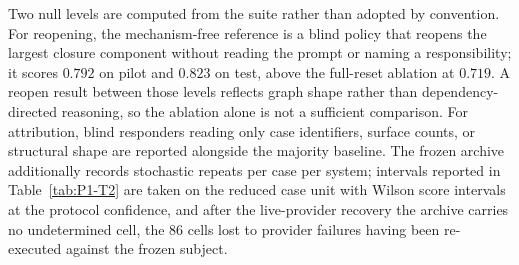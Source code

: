 Two null levels are computed from the suite rather than adopted by convention.
For reopening, the mechanism-free reference is a blind policy that reopens the
largest closure component without reading the prompt or naming a
responsibility; it scores $0.792$ on pilot and $0.823$ on test, above the
full-reset ablation at $0.719$. A reopen result between those levels reflects
graph shape rather than dependency-directed reasoning, so the ablation alone is
not a sufficient comparison. For attribution, blind responders reading only case
identifiers, surface counts, or structural shape are reported alongside the
majority baseline. The frozen archive additionally records
\StochasticRepeats{} stochastic repeats per case per system; intervals reported
in Table~\ref{tab:P1-T2} are taken on the reduced case unit with Wilson score
intervals at the protocol confidence, and after the live-provider recovery the
archive carries no undetermined cell, the 86 cells lost to provider failures
having been re-executed against the frozen subject.
